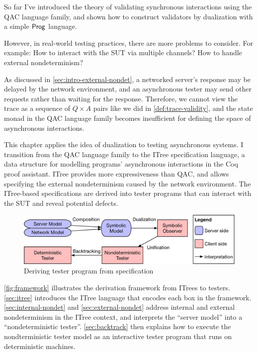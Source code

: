 So far I've introduced the theory of validating synchronous interactions using
the QAC language family, and shown how to construct validators by dualization
with a simple $\mathsf{Prog}$ language.

However, in real-world testing practices, there are more problems to consider.
For example: How to interact with the SUT via multiple channels?  How to handle
external nondeterminism?

As discussed in \autoref{sec:intro-external-nondet}, a networked server's
response may be delayed by the network environment, and an asynchronous tester
may send other requests rather than waiting for the response.  Therefore, we
cannot view the trace as a sequence of $Q\times A$ pairs like we did
in \autoref{def:trace-validity}, and the state monad in the QAC language family
becomes insufficient for defining the space of asynchronous interactions.

This chapter applies the idea of dualization to testing asynchronous systems.  I
transition from the QAC language family to the ITree specification language, a
data structure for modelling programs' asynchronous interactions in the Coq
proof assistant.  ITree provides more expressiveness than QAC, and allows
specifying the external nondeterminism caused by the network environment.  The
ITree-based specifications are derived into tester programs that can interact
with the SUT and reveal potential defects.

\begin{figure}[t]
  \includegraphics[width=\linewidth]{figures/framework}
  \caption{Deriving tester program from specification}
  \label{fig:framework}
\end{figure}

\autoref{fig:framework} illustrates the derivation framework from ITrees to
testers.  \autoref{sec:itree} introduces the ITree language that encodes each
box in the framework.  \autoref{sec:internal-nondet} and
\autoref{sec:external-nondet} address internal and external nondeterminism in
the ITree context, and interprets the ``server model'' into a ``nondeterministic
tester''.  \autoref{sec:backtrack} then explains how to execute the
nondterministic tester model as an interactive tester program that runs on
deterministic machines.

